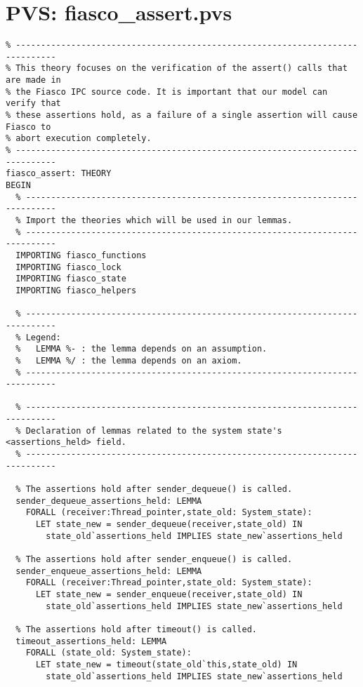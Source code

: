 \hypertarget{pvs_fiasco_assert}{\chapter{PVS: fiasco\_assert.pvs}}
\lstset{language=PVS}
\begin{lstlisting}
% ------------------------------------------------------------------------------
% This theory focuses on the verification of the assert() calls that are made in
% the Fiasco IPC source code. It is important that our model can verify that
% these assertions hold, as a failure of a single assertion will cause Fiasco to
% abort execution completely.
% ------------------------------------------------------------------------------
fiasco_assert: THEORY
BEGIN
  % ----------------------------------------------------------------------------
  % Import the theories which will be used in our lemmas.
  % ----------------------------------------------------------------------------
  IMPORTING fiasco_functions
  IMPORTING fiasco_lock
  IMPORTING fiasco_state
  IMPORTING fiasco_helpers
  
  % ----------------------------------------------------------------------------
  % Legend:
  %   LEMMA %- : the lemma depends on an assumption.
  %   LEMMA %/ : the lemma depends on an axiom.
  % ----------------------------------------------------------------------------

  % ----------------------------------------------------------------------------
  % Declaration of lemmas related to the system state's <assertions_held> field.
  % ----------------------------------------------------------------------------
 
  % The assertions hold after sender_dequeue() is called.
  sender_dequeue_assertions_held: LEMMA
    FORALL (receiver:Thread_pointer,state_old: System_state):
      LET state_new = sender_dequeue(receiver,state_old) IN
        state_old`assertions_held IMPLIES state_new`assertions_held 
   
  % The assertions hold after sender_enqueue() is called.
  sender_enqueue_assertions_held: LEMMA
    FORALL (receiver:Thread_pointer,state_old: System_state):
      LET state_new = sender_enqueue(receiver,state_old) IN
        state_old`assertions_held IMPLIES state_new`assertions_held 

  % The assertions hold after timeout() is called.
  timeout_assertions_held: LEMMA
    FORALL (state_old: System_state):
      LET state_new = timeout(state_old`this,state_old) IN
        state_old`assertions_held IMPLIES state_new`assertions_held


\end{lstlisting}
